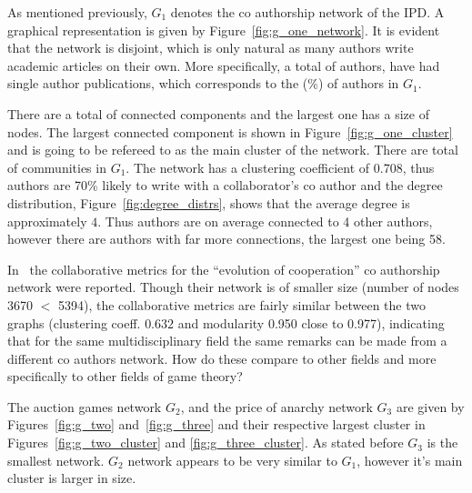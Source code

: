 \documentclass{article}
\theoremstyle{definition}
\newcommand{\isolated}{}
\newcommand{\isolatedpercentage}{}
\newcommand{\connectedcomponents}{}
\newcommand{\communities}{}
\newcommand{\largestcc}{}
\begin{document}
As mentioned previously, \(G_1\) denotes the co authorship network of the
IPD. A graphical representation is given by
Figure~\ref{fig:g_one_network}. It is evident that the network is disjoint,
which is only natural as many authors write academic articles on their own. More
specifically, a total of \isolated authors, have had single author publications,
which corresponds to the \isolatedpercentage (\%) of authors in \(G_1\).

There are a total of \connectedcomponents connected components and the largest
one has a size of \largestcc nodes. The largest connected component is shown in
Figure~\ref{fig:g_one_cluster} and is going to be refereed to as the main
cluster of the network. There are total of \communities communities in \(G_1\).
The network has a clustering coefficient of 0.708, thus authors are 70\%
likely to write with a collaborator's co author and the degree distribution,
Figure~\ref{fig:degree_distrs}, shows that the average degree is approximately
\(4\). Thus authors are on average connected to 4 other authors, however there
are authors with far more connections, the largest one being 58.

In~\cite{Liu2015} the collaborative metrics for the ``evolution of cooperation''
co authorship network were reported. Though their network is of smaller size
(number of nodes 3670 \(<\) 5394), the collaborative metrics are fairly similar
between the two graphs (clustering coeff. \(0.632\) and modularity
0.950 close to 0.977), indicating that for the same multidisciplinary field the same
remarks can be made from a different co authors network. How do these compare to other fields
and more specifically to other fields of game theory?

The auction games network \(G_2\), and the price of anarchy network \(G_3\)
are given by Figures~\ref{fig:g_two} and~\ref{fig:g_three} and their respective
largest cluster in Figures~\ref{fig:g_two_cluster} and \ref{fig:g_three_cluster}.
As stated before \(G_3\) is the smallest network. \(G_2\) network appears to be
very similar to \(G_1\), however it's main cluster is larger in size.
\end{document}
